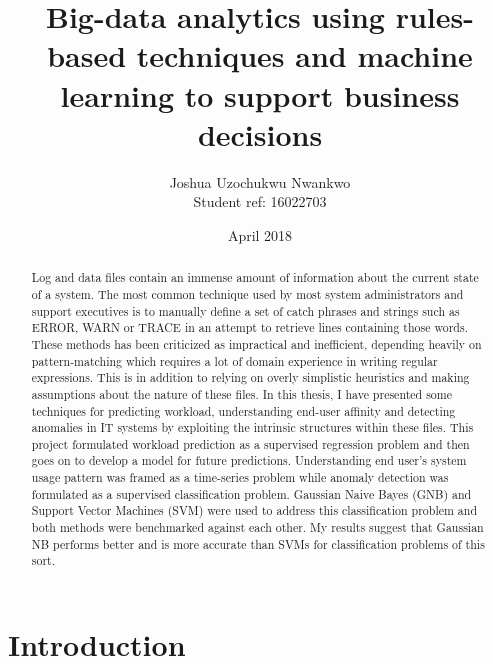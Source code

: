 \documentclass[12pt, letterpaper, titlepage]{report}
\title{\textbf{Big-data analytics using rules-based techniques and machine learning to support business decisions}}
\author{Joshua Uzochukwu Nwankwo \\ Student ref: 16022703}
\date{April 2018}
\begin{document}
\def\code#1{\texttt{#1}}

\maketitle
\newpage

\begin{abstract}
Log and data files contain an immense amount of information about the current state of a system.
The most common technique used by most system administrators and support executives is to manually define a set of catch phrases and strings such as ERROR, WARN or TRACE in an attempt to retrieve lines containing those words. These methods has been criticized as impractical and inefficient, depending heavily on pattern-matching which requires a lot of domain experience in writing regular expressions. This is in addition to relying on overly simplistic heuristics and making assumptions about the nature of these files. In this thesis, I have presented some techniques for predicting workload, understanding end-user affinity and detecting anomalies in IT systems by exploiting the intrinsic structures within these files. This project formulated workload prediction as a supervised regression problem and then goes on to develop a model for future predictions. Understanding end user's system usage pattern was framed as a time-series problem while anomaly detection was formulated as a supervised classification problem. Gaussian Naive Bayes (GNB) and Support Vector Machines (SVM) were used to address this classification problem and both methods were benchmarked against each other. My results suggest that Gaussian NB performs better and is more accurate than SVMs for classification problems of this sort.
\end{abstract}

\tableofcontents
\newpage

\chapter{Introduction}
\end{document}
